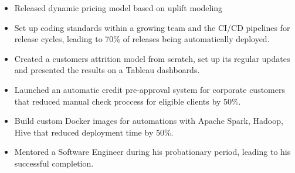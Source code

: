 \begin{itemize}
    \item Released dynamic pricing model based on uplift modeling
    \item Set up coding standards within a growing team and the CI/CD pipelines for release cycles, leading to 70\% of releases being automatically deployed.
    \item Created a customers attrition model from scratch, set up its regular updates and presented the results on a Tableau dashboards.
    \item Launched an automatic credit pre-approval system for corporate customers that reduced manual check proccess for eligible clients by 50\%.
    \item Build custom Docker images for automations with Apache Spark, Hadoop, Hive that reduced deployment time by 50\%.
    \item Mentored a Software Engineer during his probationary period, leading to his successful completion.
\end{itemize}
